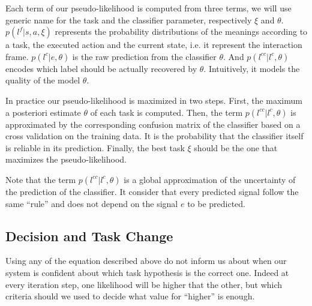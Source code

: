 Each term of our pseudo-likelihood is computed from three terms, we will use generic name for the task and the classifier parameter, respectively $\xi$ and $\theta$. $p(l^f|s,a,\xi)$ represents the probability distributions of the meanings according to a task, the executed action and the current state, i.e. it represent the interaction frame. $p(l^c | e, \theta)$ is the raw prediction from the classifier $\theta$. And $p(l^{cc} | l^c, \theta)$ encodes which label should be actually recovered by $\theta$. Intuitively, it models the quality of the model $\theta$.

In practice our pseudo-likelihood is maximized in two steps. First, the maximum a posteriori estimate $\theta$ of each task is computed. Then, the term $p(l^{cc} | l^c, \theta)$ is approximated by the corresponding confusion matrix of the classifier based on a cross validation on the training data. It is the probability that the classifier itself is reliable in its prediction. Finally, the best task $\xi$ should be the one that maximizes the pseudo-likelihood.

Note that the term $p(l^{cc} | l^c, \theta)$ is a global approximation of the uncertainty of the prediction of the classifier. It consider that every predicted signal follow the same ``rule'' and does not depend on the signal $e$ to be predicted. 



\subsection{Decision and Task Change}
\label{chapter:lfui:confidence}

Using any of the equation described above do not inform us about when our system is confident about which task hypothesis is the correct one. Indeed at every iteration step, one likelihood will be higher that the other, but which criteria should we used to decide what value for ``higher'' is enough.

